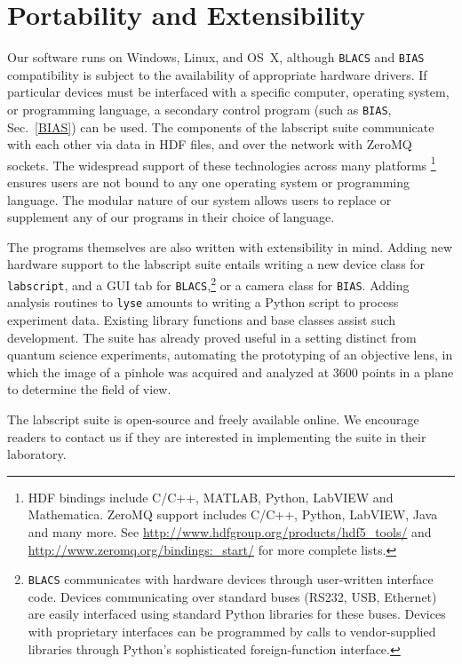\section{Portability and Extensibility}
Our software runs on Windows, Linux, and OS~X, although \texttt{BLACS} and \texttt{BIAS} compatibility is subject to the availability of appropriate hardware drivers.
If particular devices must be interfaced with a specific computer, operating system, or programming language, a secondary control program (such as \texttt{BIAS}, Sec.~\ref{BIAS}) can be used.
The components of the labscript suite communicate with each other via data in HDF files, and over the network with ZeroMQ sockets.
The widespread support of these technologies across many platforms
\footnote{
  HDF bindings include C/C++, MATLAB, Python, LabVIEW and Mathematica.
  ZeroMQ support includes C/C++, Python, LabVIEW, Java and many more. See \protect\url{http://www.hdfgroup.org/products/hdf5_tools/} and \protect\url{http://www.zeromq.org/bindings:_start/} for more complete lists.
}
ensures users are not bound to any one operating system or programming language.
The modular nature of our system allows users to replace or supplement any of our programs in their choice of language.

The programs themselves are also written with extensibility in mind.
Adding new hardware support to the labscript suite entails writing a new device class for \texttt{labscript}, and a GUI tab for \texttt{BLACS},\footnote{\texttt{BLACS} communicates with hardware devices through user-written interface code. Devices communicating over standard buses (RS232, USB, Ethernet) are easily interfaced using standard Python libraries for these buses. Devices with proprietary interfaces can be programmed by calls to vendor-supplied libraries through Python's sophisticated foreign-function interface.} or a camera class for \texttt{BIAS}.
Adding analysis routines to \texttt{lyse} amounts to writing a Python script to process experiment data.
Existing library functions and base classes assist such development.
The suite has already proved useful in a setting distinct from quantum science experiments, automating the prototyping of an objective lens, in which the image of a pinhole was acquired and analyzed at 3600 points in a plane to determine the field of view\cite{bennie_objective_2013}.

The labscript suite is open-source and freely available online\cite{labscript_web}.
We encourage readers to contact us if they are interested in implementing the suite in their laboratory.
